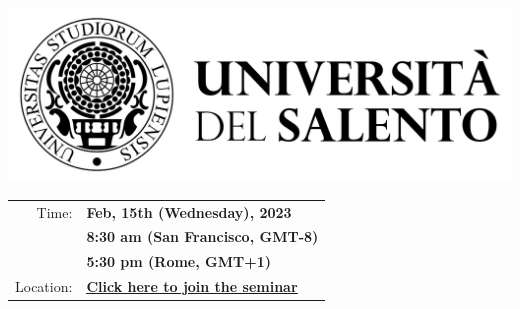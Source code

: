 \documentclass[a4paper,12pt,landscape]{article}
\begin{document}
\hfill
\begin{minipage}[c]{0.44\textwidth}
    \hfill\includegraphics[width=0.55\linewidth]{figures/logo_unisalento.png}
    \newline
    \begin{center}
        \begin{large}
            \begin{tabular}{r l}
                Time:     & \textbf{Feb, 15th (Wednesday), 2023}\\
                          & \textbf{8:30 am (San Francisco, GMT-8)}\\
                          & \textbf{5:30 pm (Rome, GMT+1)}\\
                Location: & \href{LINK_EVENT}{\underline{\textbf{\color{blue}Click here to join the seminar}}}
            \end{tabular}
        \end{large}
    \end{center}
    \vspace{0.5cm}
    \begin{mybox2}
\end{mybox2}
\end{minipage}
\end{document}
